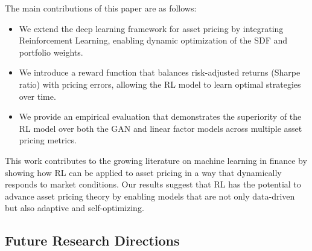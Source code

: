 The main contributions of this paper are as follows:
\begin{itemize}
    \item We extend the deep learning framework for asset pricing by integrating Reinforcement Learning, enabling dynamic optimization of the SDF and portfolio weights.
    \item We introduce a reward function that balances risk-adjusted returns (Sharpe ratio) with pricing errors, allowing the RL model to learn optimal strategies over time.
    \item We provide an empirical evaluation that demonstrates the superiority of the RL model over both the GAN and linear factor models across multiple asset pricing metrics.
\end{itemize}

This work contributes to the growing literature on machine learning in finance by showing how RL can be applied to asset pricing in a way that dynamically responds to market conditions. Our results suggest that RL has the potential to advance asset pricing theory by enabling models that are not only data-driven but also adaptive and self-optimizing.

\subsection{Future Research Directions}

